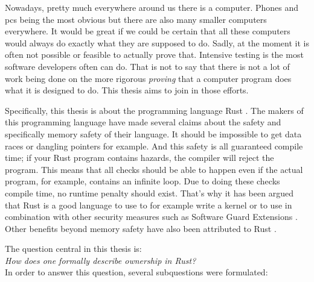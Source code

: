 Nowadays, pretty much everywhere around us there is a computer. Phones and pcs being the most obvious but there are also many smaller computers everywhere. It would be great if we could be certain that all these computers would always do exactly what they are supposed to do. Sadly, at the moment it is often not possible or feasible to actually prove that. Intensive testing is the most software developers often can do. That is not to say that there is not a lot of work being done on the more rigorous \emph{proving} that a computer program does what it is designed to do. This thesis aims to join in those efforts. 

Specifically, this thesis is about the programming language Rust \cite{matsakis2014rust}. The makers of this programming language have made several claims about the safety and specifically memory safety of their language. It should be impossible to get data races or dangling pointers for example. And this safety is all guaranteed compile time; if your Rust program contains hazards, the compiler will reject the program. This means that all checks should be able to happen even if the actual program, for example, contains an infinite loop. Due to doing these checks compile time, no runtime penalty should exist. That's why it has been argued that Rust is a good language to use to for example write a kernel \cite{levy2017kernel} or to use in combination with other security measures such as Software Guard Extensions \cite{ding2017sgx}. Other benefits beyond memory safety have also been attributed to Rust \cite{balasubramanian2017system}.


The question central in this thesis is: \\
\emph{How does one formally describe ownership in Rust?}\\

In order to answer this question, several subquestions were formulated: 

